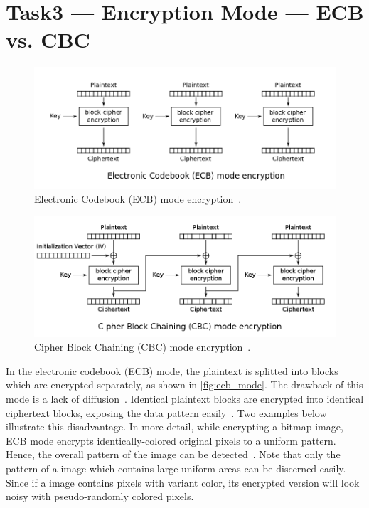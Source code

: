 \section{Task3 --- Encryption Mode --- ECB vs. CBC}
%

\begin{figure}
    \centering
    \includegraphics[height=\textheight,width=\textwidth,keepaspectratio]
    {figures/ECB_encryption.png}
    \caption{Electronic Codebook (ECB) mode encryption~\cite{cipher_mode_wiki}.}
    \label{fig:ecb_mode}
\end{figure}

\begin{figure}
    \centering
    \includegraphics[height=\textheight,width=\textwidth,keepaspectratio]
    {figures/CBC_encryption.png}
    \caption{Cipher Block Chaining (CBC) mode encryption~\cite{cipher_mode_wiki}.}
    \label{fig:cbc_mode}
\end{figure}

In the electronic codebook (ECB) mode, the plaintext is splitted into
blocks which are encrypted separately, as shown in \autoref{fig:ecb_mode}.
The drawback of this mode is a lack of diffusion~\cite{cipher_mode_wiki}.
Identical plaintext blocks are encrypted into identical ciphertext blocks,
exposing the data pattern easily~\cite{ecb_cbc_example}. Two examples below
illustrate this disadvantage. In more detail, while encrypting a bitmap
image, ECB mode encrypts identically-colored original pixels to a uniform
pattern. Hence, the overall pattern of the image can be detected~\cite{cipher_mode_wiki}.
Note that only the pattern of a image which contains large uniform areas
can be discerned easily. Since if a image contains pixels with variant 
color, its encrypted version will look noisy with pseudo-randomly colored
pixels.

